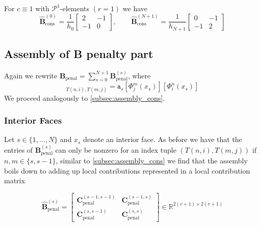 \begin{example}
    For $c\equiv 1$ with $\mathcal{P}^1$-elements $(r=1)$ we have 
    \begin{equation*}
        \widehat{\textbf{B}}_{\text{cons}}^{(0)} = \frac{1}{h_0}
        \begin{bmatrix}
            2 & -1 \\
            -1 & 0
        \end{bmatrix}
        ,\qquad 
        \widehat{\textbf{B}}_{\text{cons}}^{(N+1)} = \frac{1}{h_{N+1}}
        \begin{bmatrix}
            0 & -1 \\
            -1 & 2
        \end{bmatrix}
    \end{equation*}
\end{example}

\subsection{Assembly of B penalty part}
Again we rewrite $\textbf{B}_{\text{penal}} = \sum_{s=0}^{N+1} \textbf{B}_{\text{penal}}^{(s)}$, where
\begin{equation*}
    [\textbf{B}_{\text{penal}}^{(s)}]_{T(n,i), T(m,j)} = { \texttt{a}_s} [\Phi_j^m(x_s)] [\Phi_i^n(x_s)]
\end{equation*}
We proceed analogously to \ref{subsec:assembly_cons}.
\subsubsection{Interior Faces}
Let $s\in \{1,\ldots,N\} $ and $x_s$ denote an interior face. As before we have that 
the entries of $ \textbf{B}_{\text{penal}}^{(s)} $ can only be nonzero for an index tuple
$ (T(n,i), T(m,j)) $ if $ n,m \in \{s, s-1\} $, similar to \ref{subsec:assembly_cons} we find
that the assembly boils down to adding up local contributions represented in a local contribution
matrix

\begin{equation*}
    \widehat{\textbf{B}}_{\text{penal}}^{(s)} = 
    \begin{bmatrix}
        \textbf{C}_{\text{penal}}^{(s-1,s-1)} & \textbf{C}_{\text{penal}}^{(s-1,s)} \\
        \textbf{C}_{\text{penal}}^{(s,s-1)} & \textbf{C}_{\text{penal}}^{(s,s)} 
    \end{bmatrix}
    \in \mathbb{R}^{2(r+1) \times 2(r+1)}
\end{equation*}

